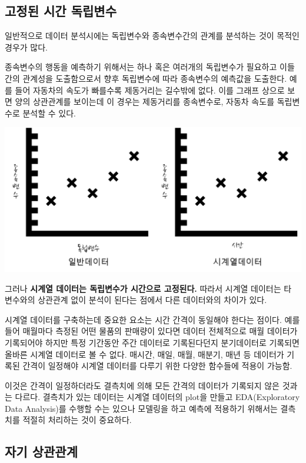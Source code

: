 \documentclass[
]{book}
\begin{document}
\hypertarget{uxace0uxc815uxb41c-uxc2dcuxac04-uxb3c5uxb9bduxbcc0uxc218}{%
\subsection{고정된 시간 독립변수}\label{uxace0uxc815uxb41c-uxc2dcuxac04-uxb3c5uxb9bduxbcc0uxc218}}

일반적으로 데이터 분석시에는 독립변수와 종속변수간의 관계를 분석하는 것이 목적인 경우가 많다.

종속변수의 행동을 예측하기 위해서는 하나 혹은 여러개의 독립변수가 필요하고 이들간의 관계성을 도출함으로서 향후 독립변수에 따라 종속변수의 예측값을 도출한다. 예를 들어 자동차의 속도가 빠를수록 제동거리는 길수밖에 없다. 이를 그래프 상으로 보면 양의 상관관계를 보이는데 이 경우는 제동거리를 종속변수로, 자동차 속도를 독립변수로 분석할 수 있다.

\includegraphics{그림1.png}

그러나 \textbf{시계열 데이터는 독립변수가 시간으로 고정된다.} 따라서 시계열 데이터는 타 변수와의 상관관계 없이 분석이 된다는 점에서 다른 데이터와의 차이가 있다.

시계열 데이터를 구축하는데 중요한 요소는 시간 간격이 동일해야 한다는 점이다. 예를 들어 매월마다 측정된 어떤 물품의 판매량이 있다면 데이터 전체적으로 매월 데이터가 기록되어야 하지만 특정 기간동안 주간 데이터로 기록된다던지 분기데이터로 기록되면 올바른 시계열 데이터로 볼 수 없다. 매시간, 매일, 매월, 매분기, 매년 등 데이터가 기록된 간격이 일정해야 시계열 데이터를 다루기 위한 다양한 함수들에 적용이 가능함.

이것은 간격이 일정하더라도 결측치에 의해 모든 간격의 데이터가 기록되지 않은 것과는 다르다. 결측치가 있는 데이터는 시계열 데이터의 plot을 만들고 EDA(Exploratory Data Analysis)를 수행할 수는 있으나 모델링을 하고 예측에 적용하기 위해서는 결측치를 적절히 처리하는 것이 중요하다.

\hypertarget{uxc790uxae30-uxc0c1uxad00uxad00uxacc4}{%
\subsection{자기 상관관계}\label{uxc790uxae30-uxc0c1uxad00uxad00uxacc4}}
\end{document}
